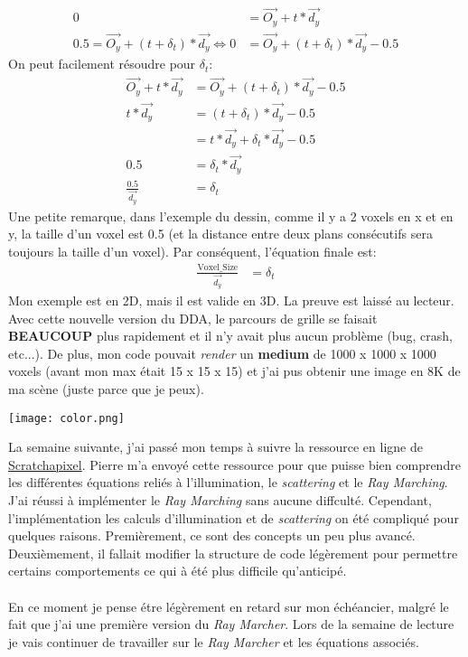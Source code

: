 \documentclass{article}
\begin{document}
\begin{align*}
    0 &= \vec{O_y} + t * \vec{d_y} \\
    0.5 = \vec{O_y} + (t + \delta_t) * \vec{d_y} \iff 0 &= \vec{O_y} + (t + \delta_t) * \vec{d_y} - 0.5
\end{align*}
On peut facilement résoudre pour $\delta_t$:
\begin{align*}
    \vec{O_y} + t * \vec{d_y} &= \vec{O_y} + (t + \delta_t) * \vec{d_y} - 0.5 \\
    t * \vec{d_y} &= (t + \delta_t) * \vec{d_y} - 0.5 \\
    &= t * \vec{d_y} + \delta_t * \vec{d_y} - 0.5 \\
    0.5 &= \delta_t * \vec{d_y} \\
    \frac{0.5}{\vec{d_y}} &= \delta_t
\end{align*}
Une petite remarque, dans l'exemple du dessin, comme il y a 2 voxels en x et en y, la taille d'un voxel est 0.5 (et la distance entre deux plans consécutifs sera toujours la taille d'un voxel). Par conséquent, l'équation finale est:
\begin{align*}
    \frac{\text{Voxel\_Size}}{\vec{d_y}} &= \delta_t
\end{align*}
Mon exemple est en 2D, mais il est valide en 3D. La preuve est laissé au lecteur. Avec cette nouvelle version du DDA, le parcours de grille se faisait \textbf{BEAUCOUP} plus rapidement et il n'y avait plus aucun problème (bug, crash, etc...). De plus, mon code pouvait \textit{render} un \textbf{medium} de 1000 x 1000 x 1000 voxels (avant mon max était 15 x 15 x 15) et j'ai pus obtenir une image en 8K de ma scène (juste parce que je peux).
\begin{center}
    \texttt{[image: color.png]}
\end{center}
La semaine suivante, j'ai passé mon temps à suivre la ressource en ligne de \href{https://www.scratchapixel.com/lessons/3d-basic-rendering/volume-rendering-for-developers/intro-volume-rendering.html}{Scratchapixel}. Pierre m'a envoyé cette ressource pour que puisse bien comprendre les différentes équations reliés à l'illumination, le \textit{scattering} et le \textit{Ray Marching}. J'ai réussi à implémenter le \textit{Ray Marching} sans aucune diffculté. Cependant, l'implémentation les calculs d'illumination et de \textit{scattering} on été compliqué pour quelques raisons. Premièrement, ce sont des concepts un peu plus avancé. Deuxièmement, il fallait modifier la structure de code légèrement pour permettre certains comportements ce qui à été plus difficile qu'anticipé. \\\\
En ce moment je pense étre légèrement en retard sur mon échéancier, malgré le fait que j'ai une première version du \textit{Ray Marcher}. Lors de la semaine de lecture je vais continuer de travailler sur le \textit{Ray Marcher} et les équations associés.
\end{document}
